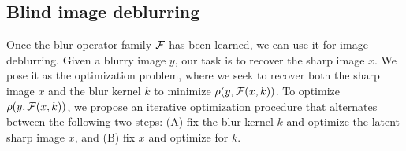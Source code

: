 \documentclass[final]{cvpr}
\begin{document}
    
        
    
        


\subsection{Blind image deblurring}
\label{subsec:imagedeblurring}


Once the blur operator family $\mathcal{F}$ has been learned, we can use it for image deblurring. Given a blurry image $y$, our task is to recover the sharp image $x$. We pose it as the optimization problem, where we seek to recover both the sharp image $x$ and the blur kernel $k$ to minimize  $\rho(y, \mathcal{F}(x, k))$. To optimize $\rho(y, \mathcal{F}(x, k))$, we propose an iterative optimization procedure that alternates between the following two steps: (A) fix the blur kernel $k$ and optimize the latent sharp image $x$, and (B) fix $x$ and optimize for $k$. 
\end{document}
